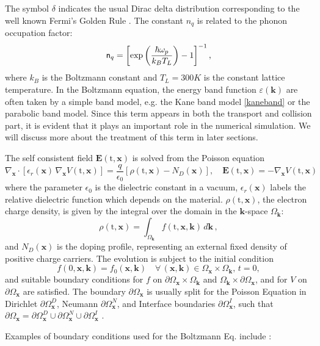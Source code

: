 \documentclass[11pt]{article}
\newcommand{\bk}{\mathbf{k}}
\newcommand{\bx}{\mathbf{x}}
\newcommand{\bE}{\mathbf{E}}
\newcommand{\ti}{\mathrm{t}}
\newcommand{\hw}{\hbar \omega_{p}}
\newcommand{\domk}{\Omega_{\bk}}
\newcommand{\intd}{\int_{\domk}}
\newcommand{\nq}{{\sf n}_{q}}
\newcommand{\kB}{k_{B}}
\newcommand{\TL}{T_{L}}
\newcommand{\kT}{\kB \TL}
\begin{document}
The symbol $\delta$ indicates the usual Dirac delta distribution
corresponding to the well known Fermi's Golden Rule \cite{book:Lundstrom}.
The constant $n_q$ is related to the phonon occupation factor:
%
$$
\nq = \left[ \exp \left( \frac{\hw}{\kT} \right) - 1 \right] ^{-1},
$$
%
where $\kB$ is the Boltzmann constant and $T_L = 300 K$ is the constant lattice temperature. In the Boltzmann equation, the energy band function $\varepsilon (\bk)$ are often taken by a simple band model, e.g. the Kane band model 
\eqref{kaneband} or the parabolic band model. Since this term appears in both the transport and collision part, it is evident that it plays an important role in the numerical simulation. We will discuss more about the treatment of this term in later sections.


%
The self consistent field $ \bE (\ti,\bx)$ is solved from the Poisson equation 
%
$$
\nabla_{\bx} \cdot \left[ \epsilon_{r}(\bx) \, \nabla_{\bx} V(\ti,\bx) \right]
 = \frac{q}{\epsilon_{0}} \left[ \rho(\ti,\bx) - N_{D}(\bx) \right] ,
\quad
\bE (\ti,\bx) = - \nabla_{\bx} V (\ti,\bx) \, 
$$
where the parameter $\epsilon_{0}$ is the dielectric constant in a vacuum, 
$\epsilon_{r}(\bx)$ labels the relative dielectric function which depends on the material. $\rho(\ti,\bx)$, the electron charge density, is given by the integral over the domain in 
the $\bk$-space $\domk$:
%
\begin{equation}
\rho(\ti,\bx) = \intd f(\ti, \bx, \bk) \, d \bk \, ,
\end{equation}
%
and $N_D(\bx)$ is the doping profile, representing an external fixed density of positive charge carriers. 
%
The evolution is subject to the initial condition
%
$$
 f(0,\bx,\bk) = f_0(\bx,\bk) \quad \forall \, (\bx,\bk) \in \Omega_{\bx} \times \domk, 
 \, t=0, 
$$
%
and suitable boundary conditions for $f$ on $\partial \Omega_{\bx} \times \domk$ and 
$\domk \times \partial \Omega_{\bx}$, and for $V$ on $\partial \Omega_{\bx}$ are satisfied. The boundary $\partial \Omega_{\bx} $
is usually split for the Poisson Equation in 
Dirichlet $\partial \Omega^D_{\bx} $, Neumann $\partial \Omega^N_{\bx}$, and Interface boundaries $\partial \Omega^I_{\bx} $,
such that  
$\partial \Omega_{\bx} = \partial \Omega^D_{\bx} \cup \partial \Omega^N_{\bx} \cup  \partial \Omega^I_{\bx} $ .

Examples of boundary conditions used for the Boltzmann Eq. include 
\cite{ref:MarkowichRS}:
%
\end{document}

